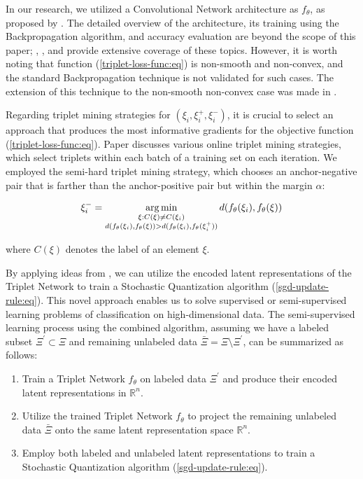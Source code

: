 In our research, we utilized a Convolutional Network architecture as $f_{\theta}$, as proposed by \cite{Lecun_1998}. The detailed overview of the architecture, its training using the Backpropagation algorithm, and accuracy evaluation are beyond the scope of this paper; \cite{Beohar_2021}, \cite{Krizhevsky_2012}, and \cite{Lecun_1998} provide extensive coverage of these topics. However, it is worth noting that function (\ref{triplet-loss-func:eq}) is non-smooth and non-convex, and the standard Backpropagation technique is not validated for such cases. The extension of this technique to the non-smooth non-convex case was made in \cite{Norkin_2021}.

Regarding triplet mining strategies for $(\xi_i, \xi^{+}_i, \xi^{-}_i)$, it is crucial to select an approach that produces the most informative gradients for the objective function (\ref{triplet-loss-func:eq}). Paper \cite{xuan2020} discusses various online triplet mining strategies, which select triplets within each batch of a training set on each iteration. We employed the semi-hard triplet mining strategy, which chooses an anchor-negative pair that is farther than the anchor-positive pair but within the margin $\alpha$:

\begin{equation}
    \label{semi-hard-triplet-mining:eq}
    \xi^{-}_i = \operatorname*{arg\,min}_{\substack{\xi: C(\xi) \neq C(\xi_i) \\ d(f_{\theta}(\xi_i), f_{\theta}(\xi)) > d(f_{\theta}(\xi_i), f_{\theta}(\xi^{+}_i))}} d(f_{\theta}(\xi_i), f_{\theta}(\xi))
\end{equation}

\noindent where $C(\xi)$ denotes the label of an element $\xi$.

By applying ideas from \cite{Hoffer_2015,MURASAKI_ANDO_SHIMAMURA_2022,Turpault_Serizel_Vincent_2019}, we can utilize the encoded latent representations of the Triplet Network to train a Stochastic Quantization  algorithm (\ref{sgd-update-rule:eq}). This novel approach enables us to solve supervised or semi-supervised learning problems of classification on high-dimensional data. The semi-supervised learning process using the combined algorithm, assuming we have a labeled subset $\Xi^\prime \subset \Xi$ and remaining unlabeled data $\bar{\Xi}=\Xi\setminus \Xi^\prime$, can be summarized as follows:

\begin{enumerate}
    \item Train a Triplet Network $f_{\theta}$ on labeled data $\Xi^\prime$ and produce their encoded latent representations in $\mathbb{R}^n$.
    \item Utilize the trained Triplet Network $f_{\theta}$ to project the remaining unlabeled data $\bar{\Xi}$ onto the same latent representation space $\mathbb{R}^n$.
    \item Employ both labeled and unlabeled latent representations to train a Stochastic Quantization  algorithm (\ref{sgd-update-rule:eq}).
\end{enumerate}
